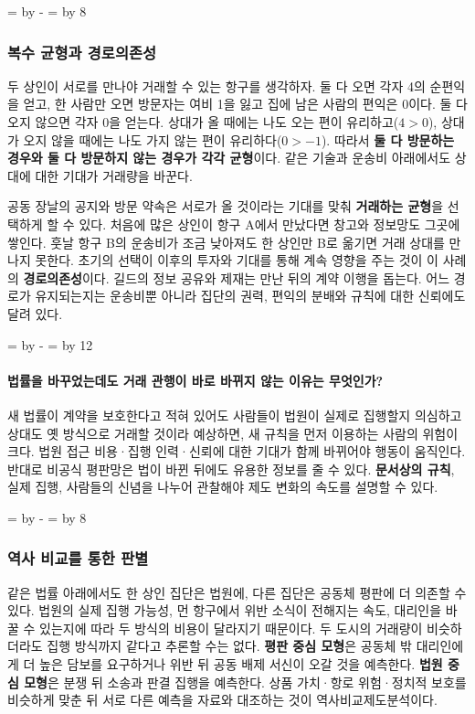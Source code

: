\documentclass[10pt,a4paper]{article}
\newcommand{\ReserveQuestionSpace}{%
  \par\begingroup
  \dimen0=\pagegoal \advance\dimen0 by -\pagetotal
  \dimen2=\baselineskip \multiply\dimen2 by 12
  \ifdim\dimen0<\dimen2 \newpage\fi
  \endgroup}
\newcommand{\ReserveReadingSectionSpace}{%
  \par\begingroup
  \dimen0=\pagegoal \advance\dimen0 by -\pagetotal
  \dimen2=\baselineskip \multiply\dimen2 by 8
  \ifdim\dimen0<\dimen2 \newpage\fi
  \endgroup}
\begin{document}
\ReserveReadingSectionSpace
\subsubsection*{복수 균형과 경로의존성}

두 상인이 서로를 만나야 거래할 수 있는 항구를 생각하자. 둘 다 오면 각자 4의 순편익을 얻고, 한 사람만 오면 방문자는 여비 1을 잃고 집에 남은 사람의 편익은 0이다. 둘 다 오지 않으면 각자 0을 얻는다. 상대가 올 때에는 나도 오는 편이 유리하고($4>0$), 상대가 오지 않을 때에는 나도 가지 않는 편이 유리하다($0>-1$). 따라서 \textbf{둘 다 방문하는 경우와 둘 다 방문하지 않는 경우가 각각 균형}이다. 같은 기술과 운송비 아래에서도 상대에 대한 기대가 거래량을 바꾼다.\par

공동 장날의 공지와 방문 약속은 서로가 올 것이라는 기대를 맞춰 \textbf{거래하는 균형}을 선택하게 할 수 있다. 처음에 많은 상인이 항구 A에서 만났다면 창고와 정보망도 그곳에 쌓인다. 훗날 항구 B의 운송비가 조금 낮아져도 한 상인만 B로 옮기면 거래 상대를 만나지 못한다. 초기의 선택이 이후의 투자와 기대를 통해 계속 영향을 주는 것이 이 사례의 \textbf{경로의존성}이다. 길드의 정보 공유와 제재는 만난 뒤의 계약 이행을 돕는다. 어느 경로가 유지되는지는 운송비뿐 아니라 집단의 권력, 편익의 분배와 규칙에 대한 신뢰에도 달려 있다.\par

\ReserveQuestionSpace
\paragraph{법률을 바꾸었는데도 거래 관행이 바로 바뀌지 않는 이유는 무엇인가?}
새 법률이 계약을 보호한다고 적혀 있어도 사람들이 법원이 실제로 집행할지 의심하고 상대도 옛 방식으로 거래할 것이라 예상하면, 새 규칙을 먼저 이용하는 사람의 위험이 크다. 법원 접근 비용·집행 인력·신뢰에 대한 기대가 함께 바뀌어야 행동이 움직인다. 반대로 비공식 평판망은 법이 바뀐 뒤에도 유용한 정보를 줄 수 있다. \textbf{문서상의 규칙}, 실제 집행, 사람들의 신념을 나누어 관찰해야 제도 변화의 속도를 설명할 수 있다.\par

\ReserveReadingSectionSpace
\subsubsection*{역사 비교를 통한 판별}

같은 법률 아래에서도 한 상인 집단은 법원에, 다른 집단은 공동체 평판에 더 의존할 수 있다. 법원의 실제 집행 가능성, 먼 항구에서 위반 소식이 전해지는 속도, 대리인을 바꿀 수 있는지에 따라 두 방식의 비용이 달라지기 때문이다. 두 도시의 거래량이 비슷하더라도 집행 방식까지 같다고 추론할 수는 없다. \textbf{평판 중심 모형}은 공동체 밖 대리인에게 더 높은 담보를 요구하거나 위반 뒤 공동 배제 서신이 오갈 것을 예측한다. \textbf{법원 중심 모형}은 분쟁 뒤 소송과 판결 집행을 예측한다. 상품 가치·항로 위험·정치적 보호를 비슷하게 맞춘 뒤 서로 다른 예측을 자료와 대조하는 것이 역사비교제도분석이다.\par
\end{document}
